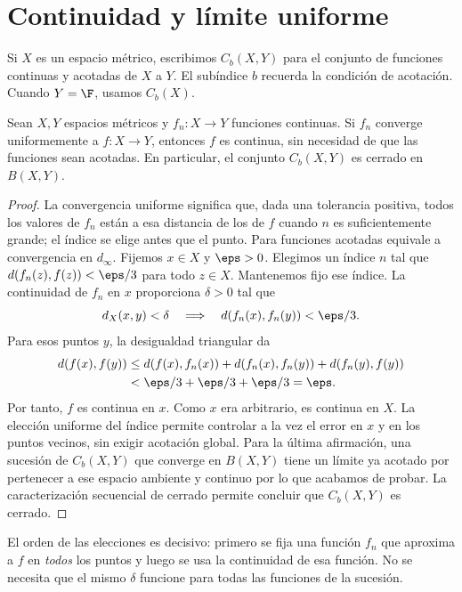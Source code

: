 \section{Continuidad y límite uniforme}
Si $X$ es un espacio métrico, escribimos $C_b(X,Y)$ para el conjunto de funciones continuas y acotadas de $X$ a $Y$. El subíndice $b$ recuerda la condición de acotación. Cuando $Y=\F$, usamos $C_b(X)$.

\begin{teorema}\label{ch25:cerradocb}\label{ch12:limite-continuo}
Sean $X,Y$ espacios métricos y $f_n:X\to Y$ funciones continuas. Si $f_n$ converge uniformemente a $f:X\to Y$, entonces $f$ es continua, sin necesidad de que las funciones sean acotadas. En particular, el conjunto $C_b(X,Y)$ es cerrado en $B(X,Y)$.
\end{teorema}
\begin{proof}
La convergencia uniforme significa que, dada una tolerancia positiva, todos los valores de $f_n$ están a esa distancia de los de $f$ cuando $n$ es suficientemente grande; el índice se elige antes que el punto. Para funciones acotadas equivale a convergencia en $d_\infty$. Fijemos $x\in X$ y $\eps>0$. Elegimos un índice $n$ tal que $d(f_n(z),f(z))<\eps/3$ para todo $z\in X$. Mantenemos fijo ese índice. La continuidad de $f_n$ en $x$ proporciona $\delta>0$ tal que
\[
 d_X(x,y)<\delta\quad\Longrightarrow\quad d(f_n(x),f_n(y))<\eps/3.
\]
Para esos puntos $y$, la desigualdad triangular da
\[
 \begin{split}
 d(f(x),f(y))&\le d(f(x),f_n(x))+d(f_n(x),f_n(y))+d(f_n(y),f(y))\\
 &<\eps/3+\eps/3+\eps/3=\eps.
 \end{split}
\]
Por tanto, $f$ es continua en $x$. Como $x$ era arbitrario, es continua en $X$. La elección uniforme del índice permite controlar a la vez el error en $x$ y en los puntos vecinos, sin exigir acotación global. Para la última afirmación, una sucesión de $C_b(X,Y)$ que converge en $B(X,Y)$ tiene un límite ya acotado por pertenecer a ese espacio ambiente y continuo por lo que acabamos de probar. La caracterización secuencial de cerrado permite concluir que $C_b(X,Y)$ es cerrado.
\end{proof}

El orden de las elecciones es decisivo: primero se fija una función $f_n$ que aproxima a $f$ en \emph{todos} los puntos y luego se usa la continuidad de esa función. No se necesita que el mismo $\delta$ funcione para todas las funciones de la sucesión.

